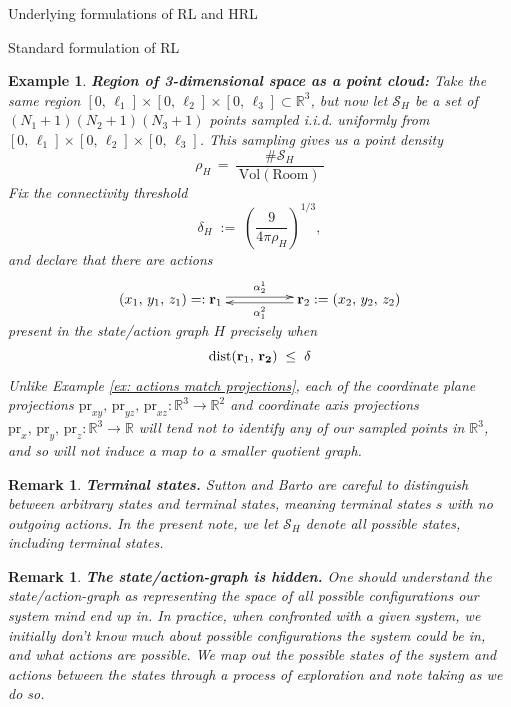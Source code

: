 \documentclass[11pt]{article}
\newtheorem{example}[subsubsection]{Example}
\newtheorem{remark}[subsubsection]{Remark}
\begin{document}
\begin{section}{Underlying formulations of RL and HRL}
\begin{subsection}{Standard formulation of RL}
\begin{example}\label{ex: point cloud}
{\bf Region of 3-dimensional space as a point cloud:}
\normalfont
Take the same region $[0,\,\ell_1]\times[0,\,\ell_2]\times[0,\,\ell_3]\subset\mathbb{R}^{3}$, but now let $\mathcal{S}_{H}$ be a set of $(N_{1}+1)(N_{2}+1)(N_{3}+1)$ points sampled i.i.d. uniformly from $[0,\,\ell_1]\times[0,\,\ell_2]\times[0,\,\ell_3]$. This sampling gives us a {\em point density}
$$
\rho_{H}\,=\,\frac{\#\mathcal{S}_{H}}{\ \text{Vol}(\text{Room})\ }
$$
Fix the {\em connectivity threshold}
$$
\delta_{H}
\;:=\;
\left(
\frac{9}{4\pi\rho_{H}}
\right)^{\!1/3},
$$
and declare that there are actions
$$
\begin{xy}
(0,0)*+{(x_{1},\,y_{1},\,z_{1})=:\bold{r}_{1}}="1";
(45,0)*+{\bold{r}_{2}:=(x_{2},\,y_{2},\,z_{2})}="2";
{\ar@<2pt>^{\alpha^{1}_{2}} "1"; "2"}
{\ar@<2pt>^{\alpha^{2}_{1}} "2"; "1"}
\end{xy}
$$
present in the state/action graph $H$ precisely when
$$
\text{dist}(\bold{r}_{1},\,\bold{r_{2}})
\;\le\;\delta
$$
Unlike Example \ref{ex: actions match projections},  each of the coordinate plane projections $\text{pr}_{xy},\,\text{pr}_{yz},\,\text{pr}_{xz}:\mathbb{R}^{3}\longrightarrow\mathbb{R}^{2}$ and coordinate axis projections $\text{pr}_{x},\,\text{pr}_{y},\,\text{pr}_{z}:\mathbb{R}^{3}\longrightarrow\mathbb{R}$ will tend not to identify any of our sampled points in $\mathbb{R}^{3}$, and so will not induce a map to a smaller quotient graph.
\end{example}

\begin{remark}
{\bf Terminal states.}
\normalfont
Sutton and Barto are careful to distinguish between arbitrary states and {\em terminal} states, meaning terminal states $s$ with no outgoing actions. In the present note, we let $\mathcal{S}_{H}$ denote {\em all} possible states, including terminal states.
\end{remark}

\begin{remark}
{\bf The state/action-graph is {\em hidden}.}
\normalfont
One should understand the state/action-graph as representing the space of all possible configurations our system mind end up in. In practice, when confronted with a given system, we initially don't know much about possible configurations the system could be in, and what actions are possible. We map out the possible states of the system and actions between the states through a process of exploration and note taking as we do so.


\end{remark}
\end{subsection}
\end{section}
\end{document}
